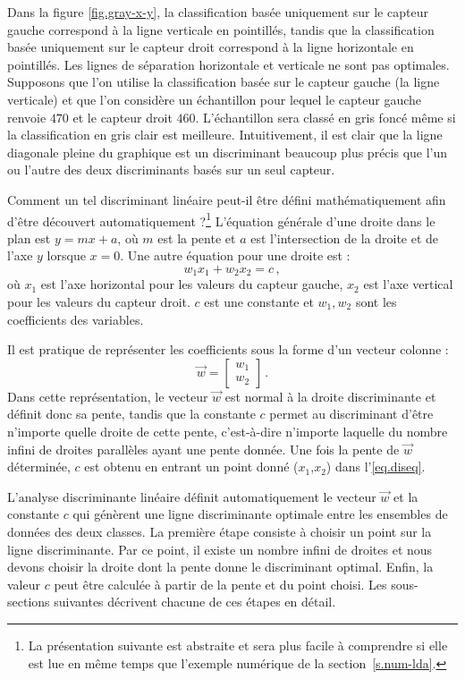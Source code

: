 Dans la figure \ref{fig.gray-x-y}, la classification basée uniquement sur le capteur gauche correspond à la ligne verticale en pointillés, tandis que la classification basée uniquement sur le capteur droit correspond à la ligne horizontale en pointillés. Les lignes de séparation horizontale et verticale ne sont pas optimales. Supposons que l'on utilise la classification basée sur le capteur gauche (la ligne verticale) et que l'on considère un échantillon pour lequel le capteur gauche renvoie $470$ et le capteur droit $460$. L'échantillon sera classé en gris foncé même si la classification en gris clair est meilleure. Intuitivement, il est clair que la ligne diagonale pleine du graphique est un discriminant beaucoup plus précis que l'un ou l'autre des deux discriminants basés sur un seul capteur.

Comment un tel discriminant linéaire peut-il être défini mathématiquement afin d'être découvert automatiquement ?\footnote{La présentation suivante est abstraite et sera plus facile à comprendre si elle est lue en même temps que l'exemple numérique de la section~\ref{s.num-lda}.} L'équation générale d'une droite dans le plan est $y=mx+a$, où $m$ est la pente et $a$ est l'intersection de la droite et de l'axe $y$ lorsque $x=0$. Une autre équation pour une droite est :
\begin{equation}
w_1x_1 + w_2x_2 = c\,,\label{eq.diseq}
\end{equation}
où $x_1$ est l'axe horizontal pour les valeurs du capteur gauche, $x_2$ est l'axe vertical pour les valeurs du capteur droit. $c$ est une constante et $w_1,w_2$ sont les coefficients des variables.

Il est pratique de représenter les coefficients sous la forme d'un vecteur colonne :
\[
\vec{w} = \left[ \begin{array}{c} w_1\\w_2 \end{array} \right]\,.
\]
Dans cette représentation, le vecteur $\vec{w}$ est normal à la droite discriminante et définit donc sa pente, tandis que la constante $c$ permet au discriminant d'être n'importe quelle droite de cette pente, c'est-à-dire n'importe laquelle du nombre infini de droites parallèles ayant une pente donnée. Une fois la pente de $\vec{w}$ déterminée, $c$ est obtenu en entrant un point donné ($x_1$,$x_2$) dans l'\ref{eq.diseq}.

L'analyse discriminante linéaire définit automatiquement le vecteur $\vec{w}$ et la constante $c$ qui génèrent une ligne discriminante optimale entre les ensembles de données des deux classes. La première étape consiste à choisir un point sur la ligne discriminante. Par ce point, il existe un nombre infini de droites et nous devons choisir la droite dont la pente donne le discriminant optimal. Enfin, la valeur $c$ peut être calculée à partir de la pente et du point choisi. Les sous-sections suivantes décrivent chacune de ces étapes en détail.

